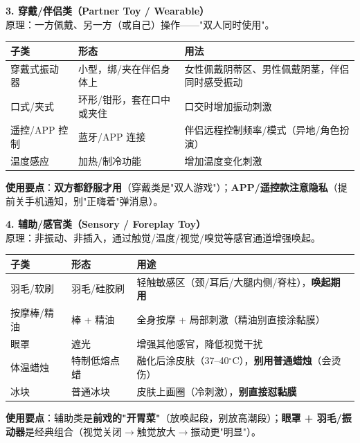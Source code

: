 \documentclass[12pt,UTF8,openany]{ctexbook}
\begin{document}
\textbf{3. 穿戴/伴侣类（Partner Toy / Wearable）}\\
原理：一方佩戴、另一方（或自己）操作——"双人同时使用"。
\begin{tabularx}{\textwidth}{l X X}
\toprule
\textbf{子类} & \textbf{形态} & \textbf{用法} \\
\midrule
穿戴式振动器 & 小型，绑/夹在伴侣身体上 & 女性佩戴阴蒂区、男性佩戴阴茎，伴侣同时感受振动 \\
口式/夹式 & 环形/钳形，套在口中或夹住 & 口交时增加振动刺激 \\
遥控/APP 控制 & 蓝牙/APP 连接 & 伴侣远程控制频率/模式（异地/角色扮演） \\
温度感应 & 加热/制冷功能 & 增加温度变化刺激 \\
\bottomrule
\end{tabularx}
\par\smallskip
\textbf{使用要点}：\textbf{双方都舒服才用}（穿戴类是"双人游戏"）；\textbf{APP/遥控款注意隐私}（提前关手机通知，别"正嗨着"弹消息）。

\textbf{4. 辅助/感官类（Sensory / Foreplay Toy）}\\
原理：非振动、非插入，通过触觉/温度/视觉/嗅觉等感官通道增强唤起。
\begin{tabularx}{\textwidth}{l X X}
\toprule
\textbf{子类} & \textbf{形态} & \textbf{用途} \\
\midrule
羽毛/软刷 & 羽毛/硅胶刷 & 轻触敏感区（颈/耳后/大腿内侧/脊柱），\textbf{唤起期用} \\
按摩棒/精油 & 棒 + 精油 & 全身按摩 + 局部刺激（精油别直接涂黏膜） \\
眼罩 & 遮光 & 增强其他感官，降低视觉干扰 \\
体温蜡烛 & 特制低熔点蜡 & 融化后涂皮肤（37--40$^\circ$C），\textbf{别用普通蜡烛}（会烫伤） \\
冰块 & 普通冰块 & 皮肤上画圈（冷刺激），\textbf{别直接怼黏膜} \\
\bottomrule
\end{tabularx}
\par\smallskip
\textbf{使用要点}：辅助类是\textbf{前戏的"开胃菜"}（放唤起段，别放高潮段）；\textbf{眼罩 + 羽毛/振动器}是经典组合（视觉关闭$\to$触觉放大$\to$振动更"明显"）。
\end{document}
